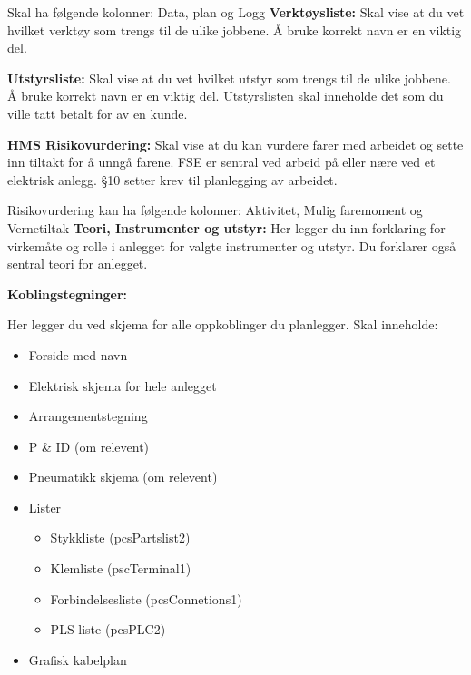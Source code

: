 \vskip 5pt 
Skal ha følgende kolonner: Data, plan og Logg
\vskip 10pt 
\vskip 10pt 
\textbf{Verktøysliste:}
\vskip 10pt 
Skal vise at du vet hvilket verktøy som trengs til de ulike jobbene. Å bruke korrekt navn er en viktig del. 

\vskip 10pt 
\textbf{Utstyrsliste:}
\vskip 10pt 
Skal vise at du vet hvilket utstyr som trengs til de ulike jobbene. Å bruke korrekt navn er en viktig del. Utstyrslisten skal inneholde det som du ville tatt betalt for av en kunde. 

\vskip 10pt 
\textbf{HMS Risikovurdering:}
\vskip 10pt 
Skal vise at du kan vurdere farer med arbeidet og sette inn tiltakt for å unngå farene. FSE er sentral ved arbeid på eller nære ved et elektrisk anlegg. §10 setter krev til planlegging av arbeidet. 

\vskip 5pt 
Risikovurdering kan ha følgende kolonner: Aktivitet, Mulig faremoment og Vernetiltak
\vskip 10pt 
\textbf{Teori, Instrumenter og utstyr:}
\vskip 10pt 
\vskip 5pt 
Her legger du inn forklaring for virkemåte og rolle i anlegget for valgte instrumenter og utstyr. Du forklarer også sentral teori for anlegget.

\vskip 5pt 
\textbf{Koblingstegninger:}

Her legger du ved skjema for alle oppkoblinger du planlegger. Skal inneholde:

\begin{itemize}
	\item Forside med navn 
	\item Elektrisk skjema for hele anlegget 
	\item Arrangementstegning 
	\item P \& ID (om relevent)
	\item Pneumatikk skjema (om relevent)
	\item Lister 
	\begin{itemize}
		\item Stykkliste (pcsPartslist2)
		\item Klemliste (pscTerminal1)
		\item Forbindelsesliste (pcsConnetions1)
		\item PLS liste (pcsPLC2)
	\end{itemize}
	\item Grafisk kabelplan
\end{itemize}

